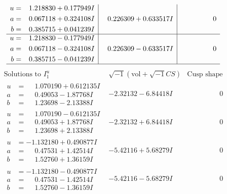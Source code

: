 \documentclass[1p]{elsarticle_modified}
\theoremstyle{definition}
\newcommand{\I}{\sqrt{-1}}
\begin{document}
$$\begin{array}{c|c|c}
\begin{aligned}
u &= \phantom{-}1.218830 + 0.177949 I \\
a &= \phantom{-}0.067118 + 0.324108 I \\
b &= \phantom{-}0.385715 + 0.041239 I\end{aligned}
 & \phantom{-}0.226309 + 0.633517 I & \phantom{-0.000000 } 0 \\ \hline\begin{aligned}
u &= \phantom{-}1.218830 - 0.177949 I \\
a &= \phantom{-}0.067118 - 0.324108 I \\
b &= \phantom{-}0.385715 - 0.041239 I\end{aligned}
 & \phantom{-}0.226309 - 0.633517 I & \phantom{-0.000000 } 0\\
 \hline 
 \end{array}$$\newpage$$\begin{array}{c|c|c}  
\text{Solutions to }I^u_{1}& \I (\text{vol} + \sqrt{-1}CS) & \text{Cusp shape}\\
 \hline 
\begin{aligned}
u &= \phantom{-}1.070190 + 0.612135 I \\
a &= \phantom{-}0.49053 - 1.87768 I \\
b &= \phantom{-}1.23698 - 2.13388 I\end{aligned}
 & -2.32132 - 6.84418 I & \phantom{-0.000000 } 0 \\ \hline\begin{aligned}
u &= \phantom{-}1.070190 - 0.612135 I \\
a &= \phantom{-}0.49053 + 1.87768 I \\
b &= \phantom{-}1.23698 + 2.13388 I\end{aligned}
 & -2.32132 + 6.84418 I & \phantom{-0.000000 } 0 \\ \hline\begin{aligned}
u &= -1.132180 + 0.490877 I \\
a &= \phantom{-}0.47531 + 1.42514 I \\
b &= \phantom{-}1.52760 + 1.36159 I\end{aligned}
 & -5.42116 + 5.68279 I & \phantom{-0.000000 } 0 \\ \hline\begin{aligned}
u &= -1.132180 - 0.490877 I \\
a &= \phantom{-}0.47531 - 1.42514 I \\
b &= \phantom{-}1.52760 - 1.36159 I\end{aligned}
 & -5.42116 - 5.68279 I & \phantom{-0.000000 } 0 \\ \hline\begin{aligned}

\end{aligned}
\end{array}$$
\end{document}
